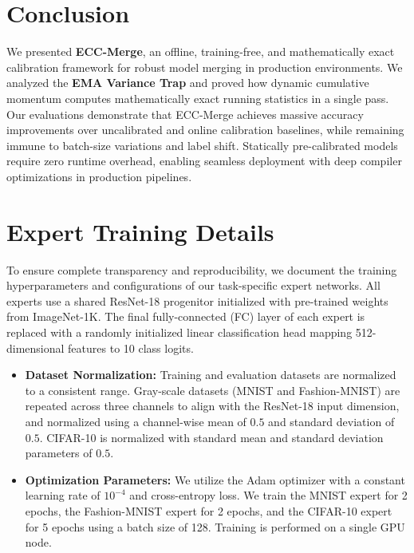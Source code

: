 \documentclass{article}
\theoremstyle{plain}
\theoremstyle{definition}
\theoremstyle{remark}
\begin{document}
\section{Conclusion}
\label{sec:conclusion}
We presented \textbf{ECC-Merge}, an offline, training-free, and mathematically exact calibration framework for robust model merging in production environments. We analyzed the \textbf{EMA Variance Trap} and proved how dynamic cumulative momentum computes mathematically exact running statistics in a single pass. Our evaluations demonstrate that ECC-Merge achieves massive accuracy improvements over uncalibrated and online calibration baselines, while remaining immune to batch-size variations and label shift. Statically pre-calibrated models require zero runtime overhead, enabling seamless deployment with deep compiler optimizations in production pipelines.




\newpage
\appendix
\onecolumn

\section{Expert Training Details}
\label{ap:training}
To ensure complete transparency and reproducibility, we document the training hyperparameters and configurations of our task-specific expert networks. All experts use a shared ResNet-18 progenitor initialized with pre-trained weights from ImageNet-1K. The final fully-connected (FC) layer of each expert is replaced with a randomly initialized linear classification head mapping 512-dimensional features to 10 class logits.
\begin{itemize}
    \item \textbf{Dataset Normalization:} Training and evaluation datasets are normalized to a consistent range. Gray-scale datasets (MNIST and Fashion-MNIST) are repeated across three channels to align with the ResNet-18 input dimension, and normalized using a channel-wise mean of $0.5$ and standard deviation of $0.5$. CIFAR-10 is normalized with standard mean and standard deviation parameters of $0.5$.
    \item \textbf{Optimization Parameters:} We utilize the Adam optimizer with a constant learning rate of $10^{-4}$ and cross-entropy loss. We train the MNIST expert for 2 epochs, the Fashion-MNIST expert for 2 epochs, and the CIFAR-10 expert for 5 epochs using a batch size of 128. Training is performed on a single GPU node.
\end{itemize}
\end{document}
